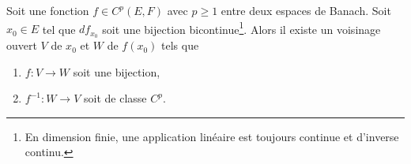 \begin{theorem} \label{ThoXWpzqCn}
	Soit une fonction \( f\in C^p(E,F)\) avec \( p\geq 1\) entre deux espaces de Banach. Soit \( x_0\in E\) tel que \( df_{x_0}\) soit une bijection bicontinue\footnote{En dimension finie, une application linéaire est toujours continue et d'inverse continu.}. Alors il existe un voisinage ouvert \( V\) de \( x_0\) et \( W\) de \( f(x_0)\) tels que
	\begin{enumerate}
		\item
		      \( f\colon V\to W\) soit une bijection,
		\item
		      \( f^{-1}\colon W\to V\) soit de classe \( C^p\).
	\end{enumerate}
\end{theorem}

